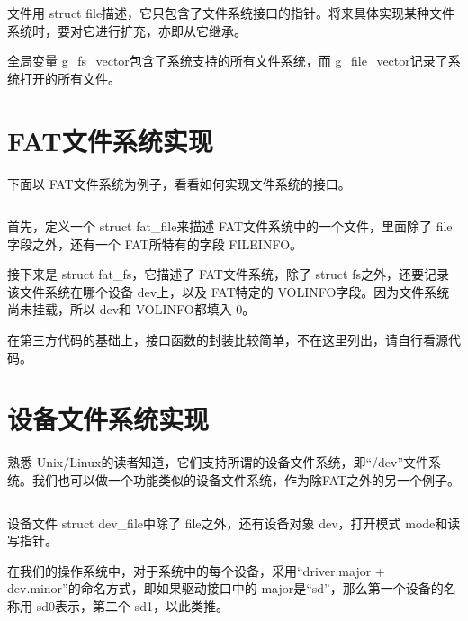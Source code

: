 \documentclass[main.tex]{subfiles}
\begin{document}
\begin{CJK*}{UTF8}{song}
\noindent
文件用 struct file描述，它只包含了文件系统接口的指针。将来具体实现某种文件系统时，要对它进行扩充，亦即从它继承。

\par
全局变量 g\_fs\_vector包含了系统支持的所有文件系统，而 g\_file\_vector记录了系统打开的所有文件。

\section{FAT文件系统实现}
下面以 FAT文件系统为例子，看看如何实现文件系统的接口。

\begin{code}
\label{code:6-4}
\inputminted[firstline=1337,lastline=1359,linenos,numbersep=5pt,frame=lines,framesep=2mm]{c}{src/chapter06/kernel/dosfs.c}
\end{code}

首先，定义一个 struct fat\_file来描述 FAT文件系统中的一个文件，里面除了 file字段之外，还有一个 FAT所特有的字段 FILEINFO。

\par
接下来是 struct fat\_fs，它描述了 FAT文件系统，除了 struct fs之外，还要记录该文件系统在哪个设备 dev上，以及 FAT特定的 VOLINFO字段。因为文件系统尚未挂载，所以 dev和 VOLINFO都填入 0。

\par
在第三方代码的基础上，接口函数的封装比较简单，不在这里列出，请自行看源代码。

\section{设备文件系统实现}
熟悉 Unix/Linux的读者知道，它们支持所谓的设备文件系统，即“/dev”文件系统。我们也可以做一个功能类似的设备文件系统，作为除FAT之外的另一个例子。

\begin{code}
\label{code:6-5}
\inputminted[firstline=12,lastline=31,linenos,numbersep=5pt,frame=lines,framesep=2mm]{c}{src/chapter06/kernel/devfs.c}
\end{code}

\noindent
设备文件 struct dev\_\-file中除了 file之外，还有设备对象 dev，打开模式 mode和读写指针。

\par
在我们的操作系统中，对于系统中的每个设备，采用“driver.major + dev.minor”的命名方式，即如果驱动接口中的 major是“sd”，那么第一个设备的名称用 sd0表示，第二个 sd1，以此类推。


\end{CJK*}
\end{document}
